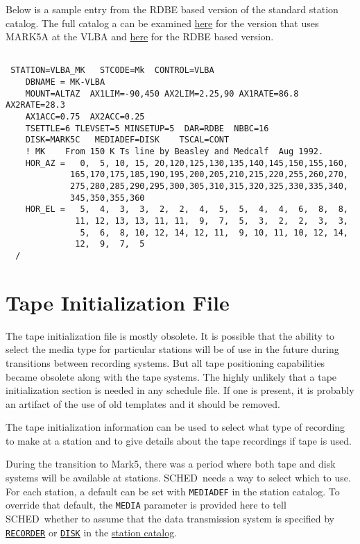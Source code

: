 \documentclass{report}
\newcommand{\schedb}{{\sc SCHED~}}
\begin{document}
\begin{description}
\end{description}

Below is a sample entry from the RDBE based version of the standard 
station catalog.  The full catalog a can be examined 
{\href{catalogs/stations.dat}{here}} for the 
version that uses MARK5A at the VLBA and 
{\href{catalogs/stations\_RDBE.dat}{here}} for the RDBE
based version.

\begin{verbatim}

 STATION=VLBA_MK   STCODE=Mk  CONTROL=VLBA 
    DBNAME = MK-VLBA
    MOUNT=ALTAZ  AX1LIM=-90,450 AX2LIM=2.25,90 AX1RATE=86.8 AX2RATE=28.3
    AX1ACC=0.75  AX2ACC=0.25
    TSETTLE=6 TLEVSET=5 MINSETUP=5  DAR=RDBE  NBBC=16 
    DISK=MARK5C   MEDIADEF=DISK    TSCAL=CONT
    ! MK    From 150 K Ts line by Beasley and Medcalf  Aug 1992.
    HOR_AZ =   0,  5, 10, 15, 20,120,125,130,135,140,145,150,155,160,
             165,170,175,185,190,195,200,205,210,215,220,255,260,270,
             275,280,285,290,295,300,305,310,315,320,325,330,335,340,
             345,350,355,360
    HOR_EL =   5,  4,  3,  3,  2,  2,  4,  5,  5,  4,  4,  6,  8,  8,
              11, 12, 13, 13, 11, 11,  9,  7,  5,  3,  2,  2,  3,  3,
               5,  6,  8, 10, 12, 14, 12, 11,  9, 10, 11, 10, 12, 14,
              12,  9,  7,  5
  / 

\end{verbatim}

\section{\label{SEC:TPINI}Tape Initialization File}

The tape initialization file is mostly obsolete.  It is possible that
the ability to select the media type for particular stations will be
of use in the future during transitions between recording systems.
But all tape positioning capabilities became obsolete along with the
tape systems.  The highly unlikely that a tape initialization section
is needed in any schedule file.  If one is present, it is probably an
artifact of the use of old templates and it should be removed.

The tape initialization information can be used to select what
type of recording to make at a station and to give details about
the tape recordings if tape is used.

During the transition to Mark5, there was a period where both
tape and disk systems will be available at stations.  \schedb needs
a way to select which to use.  For each station, a default can be
set with {\tt MEDIADEF} in the station catalog. To override that
default, the {\tt MEDIA} parameter is provided here to tell
\schedb whether to assume that the data transmission system is
specified by 
{\hyperref[SEC:STACAT]{{\tt RECORDER}}} or 
{\hyperref[SEC:STACAT]{{\tt DISK}}} in the 
{\hyperref[SEC:STACAT]{station catalog}}.
\end{document}
